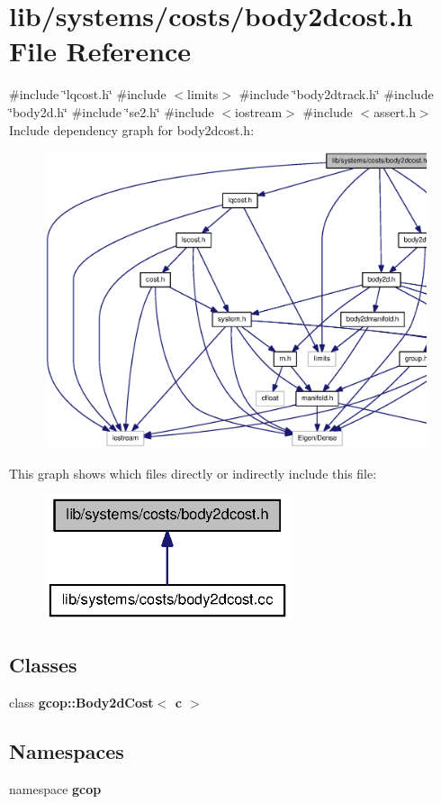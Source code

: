 \section{lib/systems/costs/body2dcost.h \-File \-Reference}
\label{body2dcost_8h}
{\ttfamily \#include \char`\"{}lqcost.\-h\char`\"{}}\*
{\ttfamily \#include $<$limits$>$}\*
{\ttfamily \#include \char`\"{}body2dtrack.\-h\char`\"{}}\*
{\ttfamily \#include \char`\"{}body2d.\-h\char`\"{}}\*
{\ttfamily \#include \char`\"{}se2.\-h\char`\"{}}\*
{\ttfamily \#include $<$iostream$>$}\*
{\ttfamily \#include $<$assert.\-h$>$}\*
\-Include dependency graph for body2dcost.\-h\-:
\nopagebreak
\begin{figure}[H]
\begin{center}
\leavevmode
\includegraphics[width=350pt]{body2dcost_8h__incl}
\end{center}
\end{figure}
\-This graph shows which files directly or indirectly include this file\-:
\nopagebreak
\begin{figure}[H]
\begin{center}
\leavevmode
\includegraphics[width=204pt]{body2dcost_8h__dep__incl}
\end{center}
\end{figure}
\subsection*{\-Classes}
\begin{DoxyCompactItemize}
\item 
class {\bf gcop\-::\-Body2d\-Cost$<$ c $>$}
\end{DoxyCompactItemize}
\subsection*{\-Namespaces}
\begin{DoxyCompactItemize}
\item 
namespace {\bf gcop}
\end{DoxyCompactItemize}
